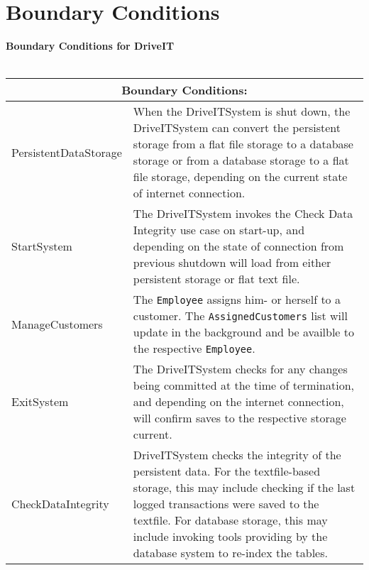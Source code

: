 \section{Boundary Conditions}

\textbf{Boundary Conditions for DriveIT}\\\\
\begin{tabular}{ | p{4cm} | p{10cm} | }
  \hline
  \multicolumn{2}{|c|}{Boundary Conditions:} \\
  \hline
  PersistentDataStorage & When the DriveITSystem is shut down, the DriveITSystem can convert the persistent storage from a flat file storage to a database storage or from a database storage to a flat file storage, depending on the current state of internet connection.\\
  \hline
    StartSystem & The DriveITSystem invokes the Check Data Integrity use case on start-up, and depending on the state of connection from previous shutdown will load from either persistent storage or flat text file.\\
    \hline
    ManageCustomers & The \texttt{Employee} assigns him- or herself to a customer. The \texttt{AssignedCustomers} list will update in the background and be availble to the respective \texttt{Employee}.\\
    \hline
    ExitSystem & The DriveITSystem checks for any changes being committed at the time of termination, and depending on the internet connection, will confirm saves to the respective storage current. \\
    \hline
    CheckDataIntegrity & DriveITSystem checks the integrity of the persistent data. For the textfile-based storage, this may include checking if the last logged transactions were saved to the textfile. For database storage, this may include invoking tools providing by the database system to re-index the tables. \\
  \hline
\end{tabular}